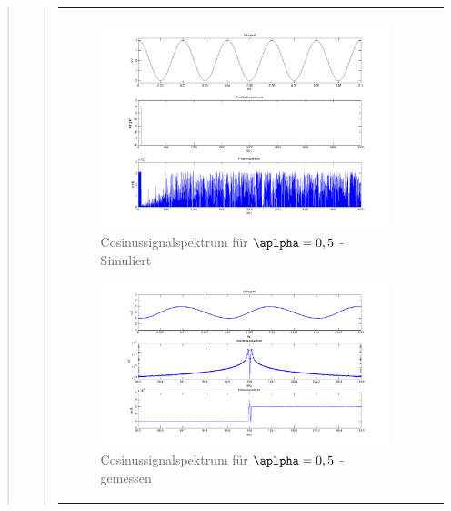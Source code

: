 \begin{quote}
\begin{quote}
\begin{center}
\begin{tabular}{ll}
\begin{minipage}{0.6\textwidth}
                    \begin{figure}[H]
                        \label{fig:}            
                        \includegraphics[scale=0.25]{./Bilder/cos_alpha5.png} %
                        \caption{Cosinussignalspektrum für $\aplpha = 0,5$ - Simuliert}
                    \end{figure}

                \end{minipage}
                \begin{minipage}{0.6\textwidth}

                    \begin{figure}[H]
                        \label{fig:}            
                        \includegraphics[scale=0.3]{./Bilder/cos_alpha5_-_gemessen.png} %
                        \caption{Cosinussignalspektrum für $\aplpha = 0,5$ - gemessen}
                    \end{figure}                
               \vspace{-1.5em}


\end{minipage}
\end{tabular}
\end{center}
\end{quote}
\end{quote}
